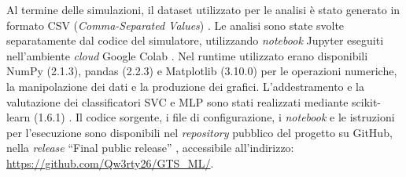 \noindent Al termine delle simulazioni, il dataset utilizzato per le analisi è stato generato in formato CSV (\emph{Comma-Separated Values}) \cite{shafranovich2005rfc4180}. Le analisi sono state svolte separatamente dal codice del simulatore, utilizzando \emph{notebook} Jupyter \cite{kluyver2016jupyter} eseguiti nell'ambiente \emph{cloud} Google Colab \cite{googlecolab}. Nel runtime utilizzato erano disponibili NumPy (2.1.3), pandas (2.2.3) \cite{mckinney2010data} e Matplotlib (3.10.0) \cite{hunter2007matplotlib} per le operazioni numeriche, la manipolazione dei dati e la produzione dei grafici. L'addestramento e la valutazione dei classificatori SVC e MLP sono stati realizzati mediante scikit-learn (1.6.1) \cite{pedregosa2011scikit}.
\newline Il codice sorgente, i file di configurazione, i \emph{notebook} e le istruzioni per l'esecuzione sono disponibili nel \emph{repository} pubblico del progetto su GitHub, nella \emph{release} ``Final public release'' \cite{asaro2026gtsml}, accessibile all'indirizzo: \url{https://github.com/Qw3rty26/GTS_ML/}.